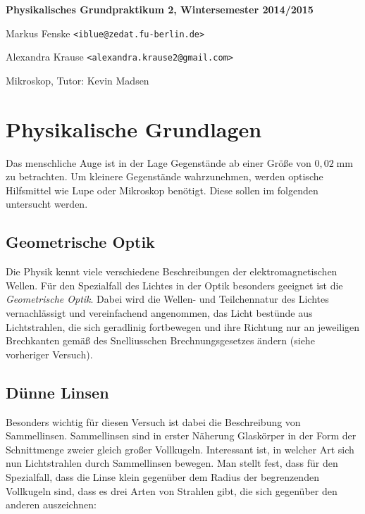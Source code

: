 \documentclass[a4paper,german,12pt,smallheadings]{scrartcl}
\begin{document}
\begin{titlepage}

\end{titlepage}

\allowdisplaybreaks %
\begin{center}
\bfseries %
\sffamily %
\vspace{-40pt}
Physikalisches Grundpraktikum 2, Wintersemester 2014/2015

Markus Fenske \texttt{<iblue@zedat.fu-berlin.de>}

Alexandra Krause \texttt{<alexandra.krause2@gmail.com>}

Mikroskop, Tutor: Kevin Madsen
\vspace{-10pt}
\end{center}

\section{Physikalische Grundlagen}

Das menschliche Auge ist in der Lage Gegenstände ab einer Größe von $0{,}02
\operatorname{mm}$ zu betrachten. Um kleinere Gegenstände wahrzunehmen, werden
optische Hilfsmittel wie Lupe oder Mikroskop benötigt. Diese sollen im
folgenden untersucht werden.

\subsection{Geometrische Optik}

Die Physik kennt viele verschiedene Beschreibungen der elektromagnetischen
Wellen. Für den Spezialfall des Lichtes in der Optik besonders geeignet ist die
\textit{Geometrische Optik}. Dabei wird die Wellen- und Teilchennatur des
Lichtes vernachlässigt und vereinfachend angenommen, das Licht bestünde aus
Lichtstrahlen, die sich geradlinig fortbewegen und ihre Richtung nur an
jeweiligen Brechkanten gemäß des Snelliusschen Brechnungsgesetzes ändern (siehe
vorheriger Versuch).

\subsection{Dünne Linsen}

Besonders wichtig für diesen Versuch ist dabei die Beschreibung von
Sammellinsen. Sammellinsen sind in erster Näherung Glaskörper in der Form der
Schnittmenge zweier gleich großer Vollkugeln. Interessant ist, in welcher Art
sich nun Lichtstrahlen durch Sammellinsen bewegen. Man stellt fest, dass für
den Spezialfall, dass die Linse klein gegenüber dem Radius der begrenzenden
Vollkugeln sind, dass es drei Arten von Strahlen gibt, die sich gegenüber den
anderen auszeichnen:
\end{document}
